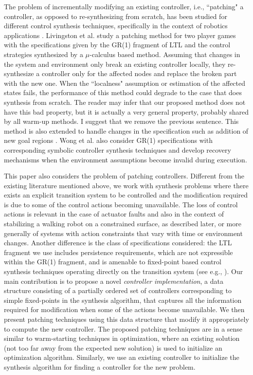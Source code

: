 The problem of incrementally modifying an existing controller, i.e., ``patching" a controller, as opposed to re-synthesizing from scratch, has been studied for different control synthesis techniques, specifically in the context of robotics applications \cite{Livingston,Livingston2014,wong2014correct}. Livingston et al. \cite{Livingston} study a patching method for two player games with the specifications given by the GR(1) fragment of LTL and the control strategies synthesized by a $ \mu $-calculus based method. Assuming that changes in the system and environment only break an existing controller locally, they re-synthesize a controller only for the affected nodes and replace the broken part with the new one. When the ``localness" assumption or estimation of the affected states fails, the performance of this method could degrade to the case that does synthesis from scratch. {\color{purple} 
The reader may infer that our proposed method does not have this bad property, but it is actually a very general property, probably shared by all warm-up methods.
I suggest that we remove the previous sentence.
}This method is also extended to handle changes in the specification such as addition of new goal regions \cite{Livingston2014}. Wong et al. \cite{wong2014correct} also consider GR(1) specifications with corresponding symbolic controller synthesis techniques and develop recovery mechanisms when the environment assumptions become invalid during execution. 

This paper also considers the problem of patching controllers. Different from the existing literature mentioned above, we work with synthesis problems where there exists an explicit transition system to be controlled and the modification required is due to some of the control actions becoming unavailable. The loss of control actions is relevant in the case of actuator faults and also in the context of stabilizing a walking robot on a constrained surface, as described later{\color{purple}, 
or more generally of systems with action constraints that vary with time or environment changes}. Another difference is the class of specifications considered: the LTL fragment we use includes persistence requirements, which are not expressible within the GR(1) fragment, and is amenable to fixed-point based control synthesis techniques operating directly on the transition system (see e.g., \cite{wolff2013efficient,Nilsson2017}). Our main contribution is to propose a novel \emph{controller implementation}, a data structure consisting of a partially ordered set of controllers corresponding to simple fixed-points in the synthesis algorithm,  that captures all the information required for modification when some of the actions become unavailable. We then present patching techniques using this data structure that modify it appropriately to compute the new controller. The proposed patching techniques are in a sense similar to warm-starting techniques in optimization, where an existing solution (not too far away from the expected new solution) is used to initialize an optimization algorithm. Similarly, we use an existing controller to initialize the synthesis algorithm for finding a controller for the new problem. 

